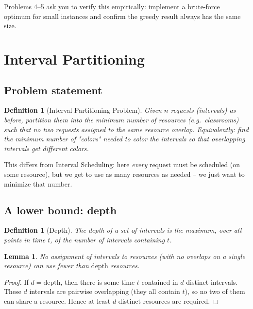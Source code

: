 \documentclass[11pt]{article}
\newtheorem{lemma}[theorem]{Lemma}
\newtheorem{definition}[theorem]{Definition}
\begin{document}
Problems 4--5 ask you to verify this empirically: implement a brute-force optimum for
small instances and confirm the greedy result always has the same size.

\section{Interval Partitioning}

\subsection{Problem statement}

\begin{definition}[Interval Partitioning Problem]
Given $n$ requests (intervals) as before, partition them into the \emph{minimum} number of
\emph{resources} (e.g.\ classrooms) such that no two requests assigned to the same
resource overlap. Equivalently: find the minimum number of "colors" needed to color the
intervals so that overlapping intervals get different colors.
\end{definition}

This differs from Interval Scheduling: here \emph{every} request must be scheduled
(on some resource), but we get to use as many resources as needed -- we just want to
minimize that number.

\subsection{A lower bound: depth}

\begin{definition}[Depth]
The \emph{depth} of a set of intervals is the maximum, over all points in time $t$, of the
number of intervals containing $t$.
\end{definition}

\begin{lemma}
\label{lem:depth-lower-bound}
No assignment of intervals to resources (with no overlaps on a single resource) can use
fewer than $\mathrm{depth}$ resources.
\end{lemma}

\begin{proof}
If $d = \mathrm{depth}$, then there is some time $t$ contained in $d$ distinct intervals.
These $d$ intervals are pairwise overlapping (they all contain $t$), so no two of them can
share a resource. Hence at least $d$ distinct resources are required.
\end{proof}
\end{document}
